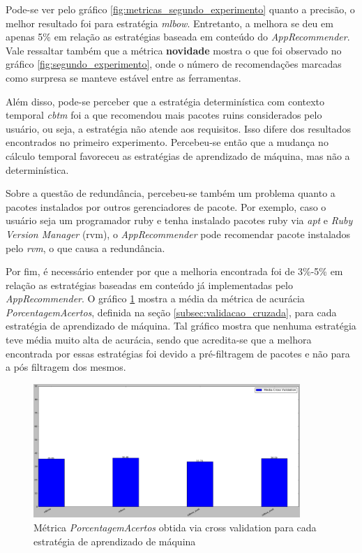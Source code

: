 Pode-se ver pelo gráfico \ref{fig:metricas_segundo_experimento} quanto a
precisão, o melhor resultado foi para estratégia \textit{mlbow}. Entretanto, a
melhora se deu em apenas 5\% em relação as estratégias baseada em conteúdo do
\textit{AppRecommender}. Vale ressaltar também que a métrica \textbf{novidade}
mostra o que foi observado no gráfico \ref{fig:segundo_experimento}, onde o
número de recomendações marcadas como surpresa se manteve estável entre as
ferramentas.

Além disso, pode-se perceber que a estratégia determinística com contexto
temporal \textit{cbtm} foi a que recomendou mais pacotes ruins considerados pelo
usuário, ou seja, a estratégia não atende aos requisitos. Isso difere dos
resultados encontrados no primeiro experimento. Percebeu-se então que a mudança
no cálculo temporal favoreceu as estratégias de aprendizado de máquina, mas não
a determinística.

Sobre a questão de redundância, percebeu-se também um problema quanto a pacotes
instalados por outros gerenciadores de pacote. Por exemplo, caso o usuário seja
um programador ruby e tenha instalado pacotes ruby via \textit{apt} e
\textit{Ruby Version Manager} (rvm), o \textit{AppRecommender} pode recomendar
pacote instalados pelo \textit{rvm}, o que causa a redundância.

Por fim, é necessário entender por que a melhoria encontrada foi de 3\%-5\% em
relação as estratégias baseadas em conteúdo já implementadas pelo
\textit{AppRecommender}. O gráfico \ref{fig:segundo_experimento_cross_validation}
mostra a média da métrica de acurácia \textit{PorcentagemAcertos}, definida na seção
\ref{subsec:validacao_cruzada}, para cada estratégia de aprendizado de máquina.
Tal gráfico mostra que nenhuma estratégia teve média muito alta de acurácia, sendo
que acredita-se que a melhora encontrada por essas estratégias foi devido a
pré-filtragem de pacotes e não para a pós filtragem dos mesmos.

\begin{figure}[h]
  \centering
  \includegraphics[width=0.9\textwidth]{figuras/segundo_experimento_cross_validation.eps}
    \caption{Métrica \textit{PorcentagemAcertos} obtida via cross validation para cada estratégia de aprendizado de máquina}
  \label{fig:segundo_experimento_cross_validation}
\end{figure}

